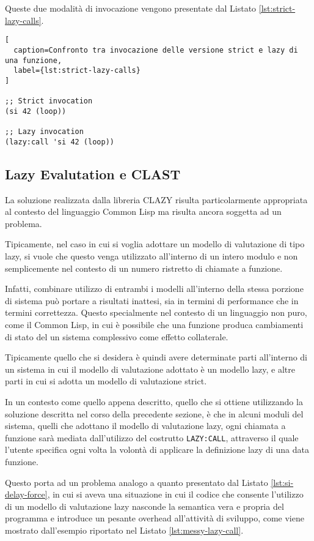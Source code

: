 Queste due modalità di invocazione vengono presentate dal Listato
\ref{lst:strict-lazy-calls}.

\begin{lstlisting}[
  caption=Confronto tra invocazione delle versione strict e lazy di una funzione,
  label={lst:strict-lazy-calls}
]

;; Strict invocation
(si 42 (loop))

;; Lazy invocation
(lazy:call 'si 42 (loop))

\end{lstlisting}

\subsection{Lazy Evalutation e CLAST}

La soluzione realizzata dalla libreria CLAZY risulta particolarmente appropriata
al contesto del linguaggio Common Lisp ma risulta ancora soggetta ad un
problema.

Tipicamente, nel caso in cui si voglia adottare un modello di valutazione di
tipo lazy, si vuole che questo venga utilizzato all'interno di un intero modulo
e non semplicemente nel contesto di un numero ristretto di chiamate a funzione.

Infatti, combinare utilizzo di entrambi i modelli all'interno della stessa
porzione di sistema può portare a risultati inattesi, sia in termini di
performance che in termini correttezza. Questo specialmente nel contesto di un
linguaggio non puro, come il Common Lisp, in cui è possibile che una funzione
produca cambiamenti di stato del un sistema complessivo come effetto
collaterale.

Tipicamente quello che si desidera è quindi avere determinate parti all'interno
di un sistema in cui il modello di valutazione adottato è un modello lazy, e
altre parti in cui si adotta un modello di valutazione strict.

In un contesto come quello appena descritto, quello che si ottiene utilizzando
la soluzione descritta nel corso della precedente sezione, è che in alcuni
moduli del sistema, quelli che adottano il modello di valutazione lazy, ogni
chiamata a funzione sarà mediata dall'utilizzo del costrutto \texttt{LAZY:CALL},
attraverso il quale l'utente specifica ogni volta la volontà di applicare la
definizione lazy di una data funzione.

Questo porta ad un problema analogo a quanto presentato dal Listato
\ref{lst:si-delay-force}, in cui si aveva una situazione in cui il codice che
consente l’utilizzo di un modello di valutazione lazy nasconde la semantica vera
e propria del programma e introduce un pesante overhead all'attività di
sviluppo, come viene mostrato dall'esempio riportato nel Listato
\ref{lst:messy-lazy-call}.

